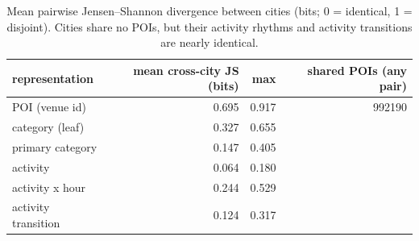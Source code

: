 \begin{table}[t]
\centering\small
\caption{Mean pairwise Jensen--Shannon divergence between cities (bits; 0 = identical, 1 = disjoint). Cities share no POIs, but their activity rhythms and activity transitions are nearly identical.}
\label{tab:A2_abstraction_ladder}
\begin{tabular}{lrrr}
\toprule
representation & mean cross-city JS (bits) & max & shared POIs (any pair) \\
\midrule
POI (venue id) & 0.695 & 0.917 & 992190 \\
category (leaf) & 0.327 & 0.655 &  \\
primary category & 0.147 & 0.405 &  \\
activity & 0.064 & 0.180 &  \\
activity x hour & 0.244 & 0.529 &  \\
activity transition & 0.124 & 0.317 &  \\
\bottomrule
\end{tabular}
\end{table}
